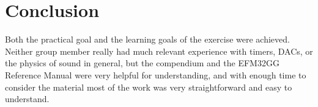 \chapter{Conclusion}

Both the practical goal and the learning goals of the exercise were achieved. Neither group member really had much relevant experience with timers, DACs, or the physics of sound in general, but the compendium \cite{compendium} and the EFM32GG Reference Manual \cite{efm32ggref} were very helpful for understanding, and with enough time to consider the material most of the work was very straightforward and easy to understand.
